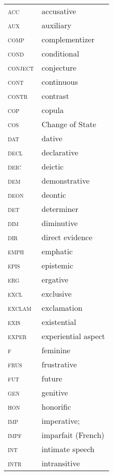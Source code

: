 
\begin{tabularx}{.5\textwidth}{@{}>{\scshape}lQ} 
acc & accusative\\
aux & auxiliary\\
comp & complementizer\\
cond & conditional\\
conject & conjecture\\
cont & continuous\\
contr & contrast\\
cop & copula\\
cos & Change of State\\
dat & dative\\
decl & declarative\\
deic & deictic\\
dem & demonstrative\\
deon & deontic\\
det & determiner\\
dim & diminutive\\
dir & direct evidence\\
emph & emphatic\\
epis & epistemic\\
erg & ergative\\
excl & exclusive\\
exclam & exclamation\\
exis & existential\\
exper & experiential aspect\\
f & feminine\\
frus & frustrative\\
fut & future\\
gen & genitive\\
hon & honorific\\
imp &  imperative; \\
impf & imparfait (French)\\
int & intimate speech\\
intr & intransitive\\
\end{tabularx}%
